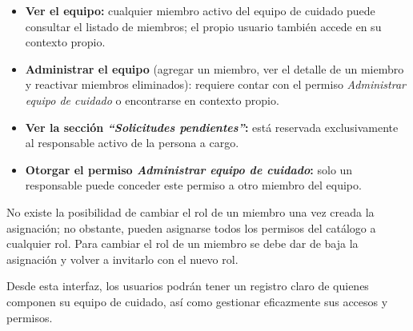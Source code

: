 \documentclass[a4paper,12pt]{article}
\begin{document}
    \begin{itemize}
        \item \textbf{Ver el equipo:} cualquier miembro activo del equipo de cuidado puede consultar el listado de miembros; el propio usuario también accede en su contexto propio.
        \item \textbf{Administrar el equipo} (agregar un miembro, ver el detalle de un miembro y reactivar miembros eliminados): requiere contar con el permiso \textit{Administrar equipo de cuidado} o encontrarse en contexto propio.
        \item \textbf{Ver la sección \textit{``Solicitudes pendientes''}:} está reservada exclusivamente al responsable activo de la persona a cargo.
        \item \textbf{Otorgar el permiso \textit{Administrar equipo de cuidado}:} solo un responsable puede conceder este permiso a otro miembro del equipo.
    \end{itemize}
    \par No existe la posibilidad de cambiar el rol de un miembro una vez creada la asignación; no obstante, pueden asignarse todos los permisos del catálogo a cualquier rol. Para cambiar el rol de un miembro se debe dar de baja la asignación y volver a invitarlo con el nuevo rol.
    \par Desde esta interfaz, los usuarios podrán tener un registro claro de quienes componen su equipo de cuidado, así como gestionar eficazmente sus accesos y permisos.
\end{document}
